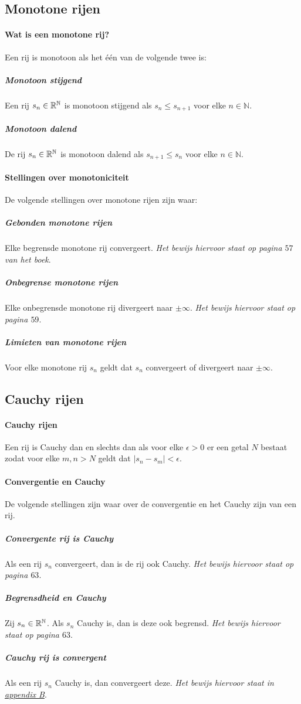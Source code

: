 \subsection{Monotone rijen}

\paragraph{Wat is een monotone rij?} Een rij is monotoon als het één van de volgende twee is:

\subparagraph{Monotoon stijgend} Een rij $s_{n}\in\mathbb{R}^{\mathbb{N}}$ is monotoon stijgend als $s_{n} \leq s_{n+1}$ voor elke $n\in\mathbb{N}$.

\subparagraph{Monotoon dalend} De rij $s_{n}\in\mathbb{R}^{\mathbb{N}}$ is monotoon dalend als $s_{n+1} \leq s_{n}$ voor elke $n\in\mathbb{N}$.

\paragraph{Stellingen over monotoniciteit} De volgende stellingen over monotone rijen zijn waar:

\subparagraph{Gebonden monotone rijen} Elke begrensde monotone rij convergeert. \textit{Het bewijs hiervoor staat op pagina $57$ van het boek}.

\subparagraph{Onbegrense monotone rijen} Elke onbegrensde monotone rij divergeert naar $\pm\infty$. \textit{Het bewijs hiervoor staat op pagina $59$}.

\subparagraph{Limieten van monotone rijen} Voor elke monotone rij $s_{n}$ geldt dat $s_{n}$ convergeert of divergeert naar $\pm\infty$.

\subsection{Cauchy rijen}

\paragraph{Cauchy rijen} Een rij is Cauchy dan en slechts dan als voor elke $\epsilon>0$ er een getal $N$ bestaat zodat voor elke $m,n>N$ geldt dat $|s_{n}-s_{m}|<\epsilon$.

\paragraph{Convergentie en Cauchy} De volgende stellingen zijn waar over de convergentie en het Cauchy zijn van een rij.

\subparagraph{Convergente rij is Cauchy} Als een rij $s_{n}$ convergeert, dan is de rij ook Cauchy. \textit{Het bewijs hiervoor staat op pagina $63$}.

\subparagraph{Begrensdheid en Cauchy} Zij $s_{n}\in\mathbb{R}^{\mathbb{N}}$. Als $s_{n}$ Cauchy is, dan is deze ook begrensd. \textit{Het bewijs hiervoor staat op pagina $63$}.

\subparagraph{Cauchy rij is convergent} Als een rij $s_{n}$ Cauchy is, dan convergeert deze. \textit{Het bewijs hiervoor staat in \hyperref[sec:AB]{appendix B}}.